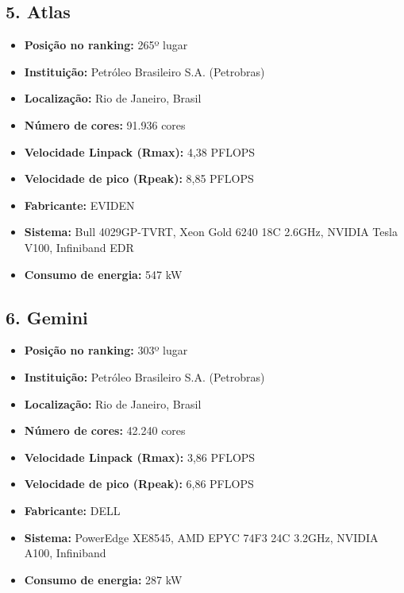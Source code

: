 \documentclass[12pt,a4paper]{article}
\begin{document}
\subsection*{5. Atlas}
\begin{itemize}
    \item \textbf{Posição no ranking:} 265º lugar
    \item \textbf{Instituição:} Petróleo Brasileiro S.A. (Petrobras)
    \item \textbf{Localização:} Rio de Janeiro, Brasil
    \item \textbf{Número de cores:} 91.936 cores
    \item \textbf{Velocidade Linpack (Rmax):} 4,38 PFLOPS
    \item \textbf{Velocidade de pico (Rpeak):} 8,85 PFLOPS
    \item \textbf{Fabricante:} EVIDEN
    \item \textbf{Sistema:} Bull 4029GP-TVRT, Xeon Gold 6240 18C 2.6GHz, NVIDIA Tesla V100, Infiniband EDR
    \item \textbf{Consumo de energia:} 547 kW
\end{itemize}

\newpage
\subsection*{6. Gemini}
\begin{itemize}
    \item \textbf{Posição no ranking:} 303º lugar
    \item \textbf{Instituição:} Petróleo Brasileiro S.A. (Petrobras)
    \item \textbf{Localização:} Rio de Janeiro, Brasil
    \item \textbf{Número de cores:} 42.240 cores
    \item \textbf{Velocidade Linpack (Rmax):} 3,86 PFLOPS
    \item \textbf{Velocidade de pico (Rpeak):} 6,86 PFLOPS
    \item \textbf{Fabricante:} DELL
    \item \textbf{Sistema:} PowerEdge XE8545, AMD EPYC 74F3 24C 3.2GHz, NVIDIA A100, Infiniband
    \item \textbf{Consumo de energia:} 287 kW
\end{itemize}
\end{document}
